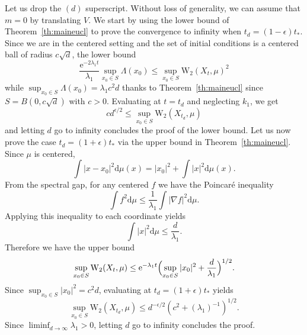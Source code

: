 \documentclass[10pt,reqno]{amsart}
\numberwithin{equation}{section}
\begin{document}
Let us drop the $(d)$ superscript. Without loss of generality, we can assume
that $m = 0$ by translating $V$. We start by using the lower bound
of Theorem~\ref{th:maineucl} to prove the convergence to infinity when
$t_d = (1-\epsilon)t_*$. Since we are in the centered setting and the set of
initial conditions is a centered ball of radius $c\sqrt{d}$, the lower bound
\begin{equation}
  \frac{\mathrm{e}^{-2\lambda_1 t}}{\lambda_1}\sup_{x_0\in S}\Lambda(x_0) 
  \leq \sup_{x_0\in S}\mathrm{W}_2(X_t, \mu)^2
\end{equation}
while $\sup_{x_0\in S}\Lambda(x_0)=\lambda_1c^2d$ thanks to
Theorem~\ref{th:maineucl} since $S=B(0,c\sqrt d)$ with $c>0$. Evaluating at
$t = t_d$ and neglecting $k_1$, we get
\begin{equation}
  cd^{\epsilon/2} \leq \sup_{x_0\in S}\mathrm{W}_2(X_{t_d}, \mu)
\end{equation}
and letting $d$ go to infinity concludes the proof of the lower bound. Let us
now prove the case $t_d = (1+\epsilon)t_*$ via the upper bound in
Theorem~\ref{th:maineucl}. Since $\mu$ is centered,
\begin{equation}
  \int|x-x_0|^2\mathrm{d}\mu(x) = |x_0|^2 + \int|x|^2\mathrm{d}\mu(x).
\end{equation}
From the spectral gap, for any centered $f$ we have the Poincaré inequality
\begin{equation}
  \int f^2\mathrm{d}\mu \leq \frac{1}{\lambda_1}\int|\nabla f|^2\mathrm{d}\mu.
\end{equation}
Applying this inequality to each coordinate yields
\begin{equation}
  \int|x|^2\mathrm{d}\mu \leq \frac{d}{\lambda_1}.
\end{equation}
Therefore we have the upper bound
\begin{equation}
  \sup_{x_0\in S}\mathrm{W}_2(X_t, \mu) 
  \leq \mathrm{e}^{-\lambda_1 t}\Bigl(\sup_{x_0\in S} |x_0|^2 + \frac{d}{\lambda_1}\Bigr)^{1/2}.
\end{equation}
Since $\sup_{x_0\in S} |x_0|^2 = c^2d$, evaluating at $t_d = (1+\epsilon)t_*$ yields
\begin{equation}
  \sup_{x_0\in S}
  \mathrm{W}_2(X_{t_d}, \mu) 
  \leq d^{-\epsilon/2}(c^2+(\lambda_1)^{-1})^{1/2}.
\end{equation}
Since $\liminf_{d\to\infty}\lambda_1 > 0$, letting $d$ go to infinity concludes the proof. 
\end{document}
